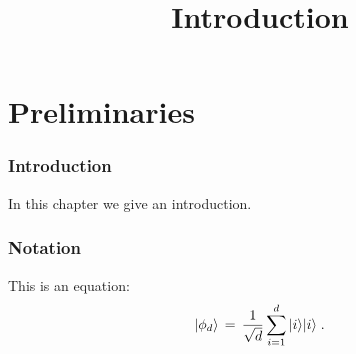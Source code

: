 

%



\part{Preliminaries}
\label{book-part-preliminaries}

\title{Introduction}
\label{introduction}


\maketitle


\tableofcontents


\section{Introduction}
\label{section:introduction}

In this chapter we give an introduction. 

\section{Notation}
\label{section-notation}

This is an equation:
\begin{equation}
\label{eq:me-state}
 |\phi_d\rangle \,=\,\frac{1}{\sqrt{d}} \sum_{i=1}^d |i\rangle|i\rangle\;.
\end{equation}








